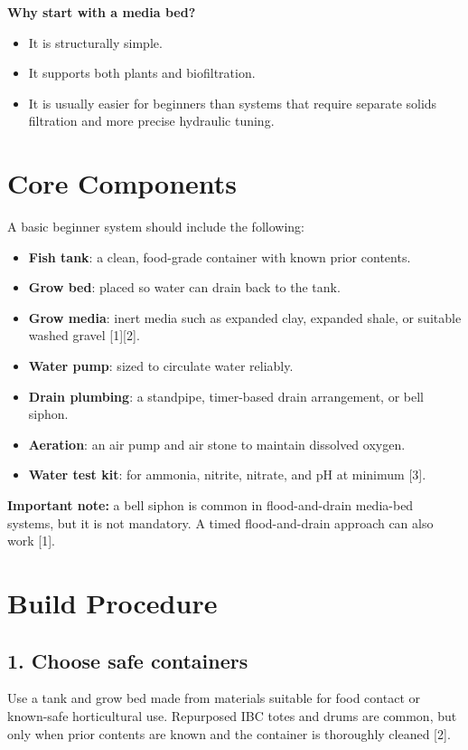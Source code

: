\documentclass[11pt]{article}
\begin{document}
\textbf{Why start with a media bed?}
\begin{itemize}
  \item It is structurally simple.
  \item It supports both plants and biofiltration.
  \item It is usually easier for beginners than systems that require separate solids filtration and more precise hydraulic tuning.
\end{itemize}

\section*{Core Components}
A basic beginner system should include the following:
\begin{itemize}
  \item \textbf{Fish tank}: a clean, food-grade container with known prior contents.
  \item \textbf{Grow bed}: placed so water can drain back to the tank.
  \item \textbf{Grow media}: inert media such as expanded clay, expanded shale, or suitable washed gravel [1][2].
  \item \textbf{Water pump}: sized to circulate water reliably.
  \item \textbf{Drain plumbing}: a standpipe, timer-based drain arrangement, or bell siphon.
  \item \textbf{Aeration}: an air pump and air stone to maintain dissolved oxygen.
  \item \textbf{Water test kit}: for ammonia, nitrite, nitrate, and pH at minimum [3].
\end{itemize}

\textbf{Important note:} a bell siphon is common in flood-and-drain media-bed systems, but it is not mandatory. A timed flood-and-drain approach can also work [1].

\section*{Build Procedure}
\subsection*{1. Choose safe containers}
Use a tank and grow bed made from materials suitable for food contact or known-safe horticultural use. Repurposed IBC totes and drums are common, but only when prior contents are known and the container is thoroughly cleaned [2].
\end{document}

